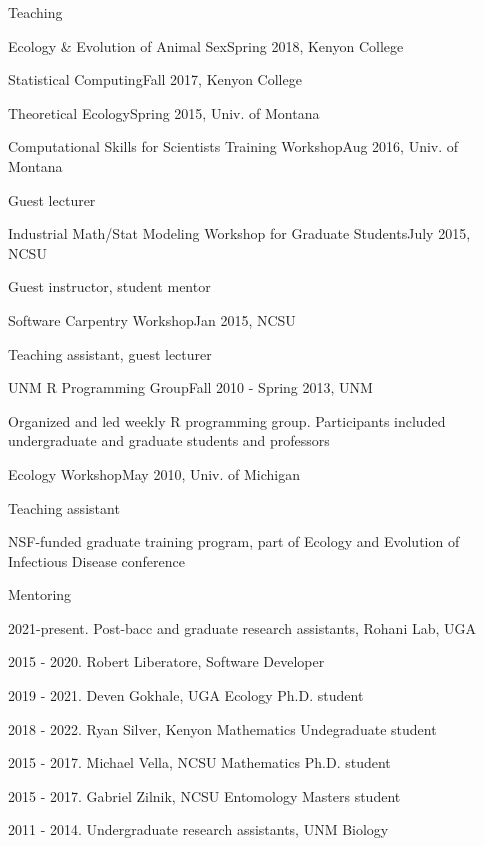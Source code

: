 \documentclass{resume} %
\begin{document}
\begin{rSection}{Teaching}
\begin{rSubsection}{Ecology \& Evolution of Animal Sex}{Spring 2018, Kenyon College}{}{}
\nullitem
\end{rSubsection}
\begin{rSubsection}{Statistical Computing}{Fall 2017, Kenyon College}{}{}
\nullitem
\end{rSubsection}
\begin{rSubsection}{Theoretical Ecology}{Spring 2015, Univ. of Montana}{}{}
\nullitem
\end{rSubsection}
\begin{rSubsection}{Computational Skills for Scientists Training Workshop}{Aug 2016, Univ. of Montana}{}{}
\item Guest lecturer
\end{rSubsection}
\begin{rSubsection}{Industrial Math/Stat Modeling Workshop for Graduate Students}{July 2015, NCSU}{}{}
\item Guest instructor, student mentor
\end{rSubsection}
\begin{rSubsection}{Software Carpentry Workshop}{Jan 2015, NCSU}{}{}
\item Teaching assistant, guest lecturer
\end{rSubsection}
\begin{rSubsection}{UNM R Programming Group}{Fall 2010 - Spring 2013, UNM}{}{}
\item Organized and led weekly R programming group. Participants included undergraduate and graduate students and professors
\end{rSubsection}
\begin{rSubsection}{Ecology Workshop}{May 2010, Univ. of Michigan}{}{}
\item Teaching assistant
\item NSF-funded graduate training program, part of Ecology and Evolution of Infectious
Disease conference
\end{rSubsection}
\end{rSection}

\begin{rSection}{Mentoring}
\item 2021-present. Post-bacc and graduate research assistants, Rohani Lab, UGA
\item 2015 - 2020. Robert Liberatore, Software Developer
\item 2019 - 2021. Deven Gokhale, UGA Ecology Ph.D. student
\item 2018 - 2022. Ryan Silver, Kenyon Mathematics Undegraduate student
\item 2015 - 2017. Michael Vella, NCSU Mathematics Ph.D. student
\item 2015 - 2017. Gabriel Zilnik, NCSU Entomology Masters student
\item 2011 - 2014. Undergraduate research assistants, UNM Biology
\end{rSection}
\end{document}
